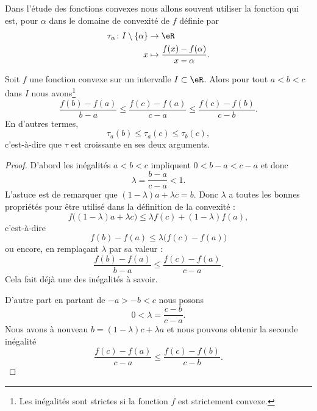 Dans l'étude des fonctions convexes nous allons souvent utiliser la fonction  qui est, pour \( \alpha\) dans le domaine de convexité de \( f\) définie par
\begin{equation}    \label{EqRYBazWd}
	\begin{aligned}
		\tau_{\alpha}\colon I\setminus\{ \alpha \} & \to \eR                                      \\
		x                                          & \mapsto \frac{ f(x)-f(\alpha) }{ x-\alpha }.
	\end{aligned}
\end{equation}

\begin{proposition} \label{PropMDMGjGO}
	Soit \( f\) une fonction convexe sur un intervalle \( I\subset \eR\). Alors pour tout \( a<b<c\) dans \( I\) nous avons\footnote{Les inégalités sont strictes si la fonction \( f\) est strictement convexe.}
	\begin{equation}
		\frac{ f(b)-f(a)  }{ b-a }\leq\frac{ f(c)-f(a) }{ c-a }\leq \frac{ f(c)-f(b) }{ c-b }.
	\end{equation}
	En d'autres termes,
	\begin{equation}
		\tau_a(b)\leq\tau_a(c)\leq \tau_b(c),
	\end{equation}
	c'est-à-dire que \( \tau\) est croissante en ses deux arguments.
\end{proposition}

\begin{proof}
	D'abord les inégalités \( a<b<c\) impliquent \( 0<b-a<c-a\) et donc
	\begin{equation}
		\lambda=\frac{ b-a }{ c-a }<1.
	\end{equation}
	L'astuce est de remarquer que \( (1-\lambda)a+\lambda c=b\). Donc \( \lambda\) a toutes les bonnes propriétés pour être utilisé dans la définition de la convexité :
	\begin{equation}
		f\big( (1-\lambda)a+\lambda c \big)\leq \lambda f(c)+(1-\lambda)f(a),
	\end{equation}
	c'est-à-dire
	\begin{equation}
		f(b)-f(a)\leq \lambda\big( f(c)-f(a) \big)
	\end{equation}
	ou encore, en remplaçant \( \lambda\) par sa valeur :
	\begin{equation}
		\frac{ f(b)-f(a) }{ b-a }\leq \frac{ f(c)-f(a) }{ c-a }.
	\end{equation}
	Cela fait déjà une des inégalités à savoir.

	D'autre part en partant de \( -a>-b<c\) nous posons
	\begin{equation}
		0<\lambda=\frac{ c-b }{ c-a }.
	\end{equation}
	Nous avons à nouveau \( b=(1-\lambda)c+\lambda a\) et nous pouvons obtenir la seconde inégalité
	\begin{equation}
		\frac{ f(c)-f(a) }{ c-a }\leq \frac{ f(c)-f(b) }{ c-b }.
	\end{equation}
\end{proof}

